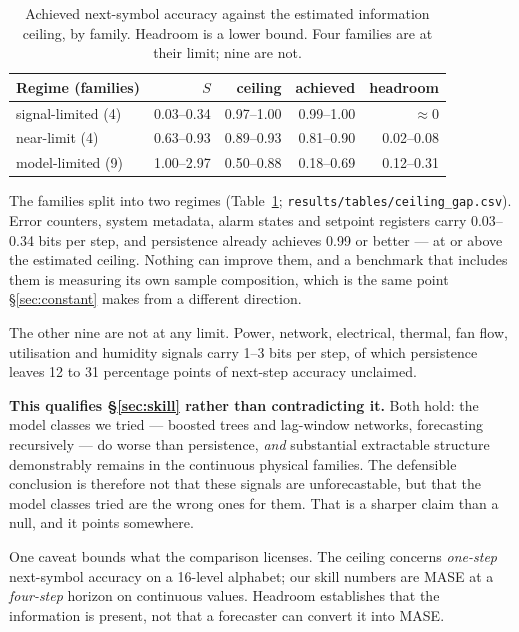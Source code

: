 \documentclass[11pt,a4paper]{article}
\newcommand{\num}[1]{#1}
\begin{document}
\begin{table}[t]
\centering
\caption{Achieved next-symbol accuracy against the estimated information
ceiling, by family. Headroom is a lower bound. Four families are at their
limit; nine are not.}
\label{tab:ceiling}
\small
\begin{tabular}{lrrrr}
\toprule
Regime (families) & \(S\) & ceiling & achieved & headroom \\
\midrule
signal-limited (4)  & 0.03--0.34 & 0.97--1.00 & 0.99--1.00 & \(\approx 0\) \\
near-limit (4)      & 0.63--0.93 & 0.89--0.93 & 0.81--0.90 & 0.02--0.08 \\
model-limited (9)   & 1.00--2.97 & 0.50--0.88 & 0.18--0.69 & 0.12--0.31 \\
\bottomrule
\end{tabular}
\end{table}

The families split into two regimes (Table~\ref{tab:ceiling};
\texttt{results/tables/ceiling\_gap.csv}). Error counters, system metadata,
alarm states and setpoint registers carry \num{0.03}--\num{0.34} bits per step,
and persistence already achieves \num{0.99} or better --- at or above the
estimated ceiling. Nothing can improve them, and a benchmark that includes them
is measuring its own sample composition, which is the same point
\S\ref{sec:constant} makes from a different direction.

The other nine are not at any limit. Power, network, electrical, thermal, fan
flow, utilisation and humidity signals carry \num{1}--\num{3} bits per step, of
which persistence leaves \num{12} to \num{31} percentage points of next-step
accuracy unclaimed.

\textbf{This qualifies \S\ref{sec:skill} rather than contradicting it.} Both
hold: the model classes we tried --- boosted trees and lag-window networks,
forecasting recursively --- do worse than persistence, \emph{and} substantial
extractable structure demonstrably remains in the continuous physical families.
The defensible conclusion is therefore not that these signals are
unforecastable, but that the model classes tried are the wrong ones for them.
That is a sharper claim than a null, and it points somewhere.

One caveat bounds what the comparison licenses. The ceiling concerns
\emph{one-step} next-symbol accuracy on a \num{16}-level alphabet; our skill
numbers are MASE at a \emph{four-step} horizon on continuous values. Headroom
establishes that the information is present, not that a forecaster can convert
it into MASE.
\end{document}
